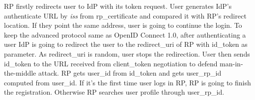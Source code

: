 RP firstly redirects user to IdP with its token request. User generates IdP's authenticate URL by \emph{iss} from rp\_certificate and compared it with RP's redirect location. If they point the same address, user is going to continue the login.
To keep the advanced protocol same as OpenID Connect 1.0, after authenticating a user IdP is going to redirect the user to the redirect\_uri of RP with id\_token as parameter. As redirect\_uri is random, user stops the redirection. User then sends id\_token to the URL received from client\_token negotiation to defend man-in-the-middle attack. RP gets user\_id from id\_token and gets user\_rp\_id computed from user\_id. If it's the first time user logs in RP, RP is going to finish the registration. Otherwise RP searches user profile through user\_rp\_id. 
